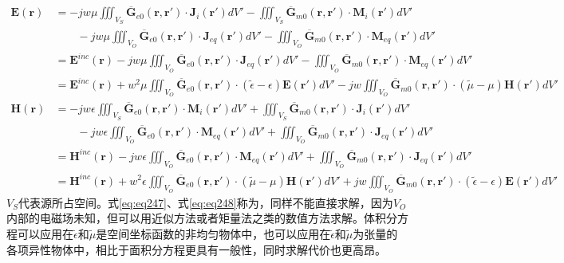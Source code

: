 \documentclass{article}
\numberwithin{equation}{section}
\renewcommand{\vec}[1]{\boldsymbol{#1}}
\begin{document}
\begin{align}
    \label{eq:eq247}
    \mathbf{E}(\vec{r})&=-jw\mu\iiint_{V_S}\overline{\mathbf{G}}_{e0}(\vec{r},\vec{r}')\cdot \mathbf{J}_i(\vec{r}')dV'-\iiint_{V_S}\overline{\mathbf{G}}_{m0}(\vec{r},\vec{r}')\cdot \mathbf{M}_i(\vec{r}')dV' \nonumber \\
                       &\qquad-jw\mu\iiint_{V_O}\overline{\mathbf{G}}_{e0}(\vec{r},\vec{r}')\cdot \mathbf{J}_{eq}(\vec{r}')dV'-\iiint_{V_O}\overline{\mathbf{G}}_{m0}(\vec{r},\vec{r}')\cdot \mathbf{M}_{eq}(\vec{r}')dV' \nonumber \\
                       &=\mathbf{E}^{inc}(\vec{r})-jw\mu\iiint_{V_O}\overline{\mathbf{G}}_{e0}(\vec{r},\vec{r}')\cdot \mathbf{J}_{eq}(\vec{r}')dV'-\iiint_{V_O}\overline{\mathbf{G}}_{m0}(\vec{r},\vec{r}')\cdot \mathbf{M}_{eq}(\vec{r}')dV' \nonumber \\
                       &=\mathbf{E}^{inc}(\vec{r})+w^2\mu\iiint_{V_O}\overline{\mathbf{G}}_{e0}(\vec{r},\vec{r}')\cdot (\tilde{\epsilon}-\epsilon)\mathbf{E}(\vec{r}')dV'-jw\iiint_{V_O}\overline{\mathbf{G}}_{m0}(\vec{r},\vec{r}')\cdot (\tilde{\mu}-\mu)\mathbf{H}(\vec{r}')dV'  \\
    \label{eq:eq248}
    \mathbf{H}(\vec{r})&=-jw\epsilon\iiint_{V_S}\overline{\mathbf{G}}_{e0}(\vec{r},\vec{r}')\cdot \mathbf{M}_i(\vec{r}')dV'+\iiint_{V_S}\overline{\mathbf{G}}_{m0}(\vec{r},\vec{r}')\cdot \mathbf{J}_i(\vec{r}')dV' \nonumber \\
                       &\qquad-jw\epsilon\iiint_{V_O}\overline{\mathbf{G}}_{e0}(\vec{r},\vec{r}')\cdot \mathbf{M}_{eq}(\vec{r}')dV'+\iiint_{V_O}\overline{\mathbf{G}}_{m0}(\vec{r},\vec{r}')\cdot \mathbf{J}_{eq}(\vec{r}')dV' \nonumber \\
                       &=\mathbf{H}^{inc}(\vec{r})-jw\epsilon\iiint_{V_O}\overline{\mathbf{G}}_{e0}(\vec{r},\vec{r}')\cdot \mathbf{M}_{eq}(\vec{r}')dV'+\iiint_{V_O}\overline{\mathbf{G}}_{m0}(\vec{r},\vec{r}')\cdot \mathbf{J}_{eq}(\vec{r}')dV' \nonumber \\
                       &=\mathbf{H}^{inc}(\vec{r})+w^2\epsilon\iiint_{V_O}\overline{\mathbf{G}}_{e0}(\vec{r},\vec{r}')\cdot (\tilde{\mu}-\mu)\mathbf{H}(\vec{r}')dV'+jw\iiint_{V_O}\overline{\mathbf{G}}_{m0}(\vec{r},\vec{r}')\cdot (\tilde{\epsilon}-\epsilon)\mathbf{E}(\vec{r}')dV'
\end{align}
$V_S$代表源所占空间。式\ref{eq:eq247}、式\ref{eq:eq248}称为\textbf{\color{blue}{体积分方程}}，同样不能直接求解，因为$V_O$内部的电磁场未知，但可以用近似方法或者矩量法之类的数值方法求解。体积分方程可以应用在$\tilde{\epsilon}$和$\tilde{\mu}$是空间坐标函数的非均匀物体中，也可以应用在$\tilde{\epsilon}$和$\tilde{\mu}$为张量的各项异性物体中，相比于面积分方程更具有一般性，同时求解代价也更高昂。\par
\end{document}
